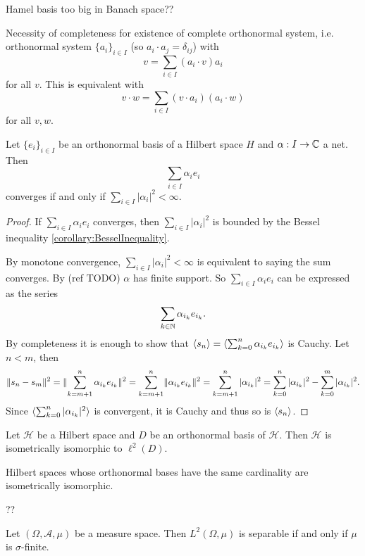 Hamel basis too big in Banach space??

Necessity of completeness for existence of complete orthonormal system, i.e. orthonormal system $\{a_i\}_{i\in I}$ (so $a_i \cdot a_j = \delta_{ij}$) with
\[ v = \sum_{i\in I}(a_i \cdot v)a_i \]
for all $v$. This is equivalent with
\[ v \cdot w = \sum_{i\in I}(v\cdot a_i)(a_i \cdot w) \]
for all $v,w$.


\begin{theorem}
Let $\{e_i\}_{i\in I}$ be an orthonormal basis of a Hilbert space $H$ and $\alpha: I\to \mathbb{C}$ a net. Then
\[ \sum_{i\in I}\alpha_i e_i \]
converges \textup{if and only if} $\sum_{i\in I}|\alpha_i|^2 < \infty$. 
\end{theorem}
\begin{proof}
If $\sum_{i\in I}\alpha_i e_i$ converges, then $\sum_{i\in I}|\alpha_i|^2$ is bounded by the Bessel inequality \ref{corollary:BesselInequality}.

By monotone convergence, $\sum_{i\in I}|\alpha_i|^2 < \infty$ is equivalent to saying the sum converges. By (ref TODO) $\alpha$ has finite support. So $\sum_{i\in I}\alpha_i e_i$ can be expressed as the series
\[ \sum_{k\in \mathbb{N}}\alpha_{i_k} e_{i_k}. \]
By completeness it is enough to show that $\langle s_n \rangle = \langle \sum_{k=0}^n\alpha_{i_k} e_{i_k} \rangle$ is Cauchy. Let $n < m$, then
\[ \lVert s_n - s_m\rVert^2 = \lVert\sum_{k=m+1}^n\alpha_{i_k} e_{i_k}\rVert^2 = \sum_{k=m+1}^n\lVert\alpha_{i_k} e_{i_k}\rVert^2 = \sum_{k=m+1}^n |\alpha_{i_k}|^2 = \sum_{k=0}^n|\alpha_{i_k}|^2 -\sum_{k=0}^m|\alpha_{i_k}|^2.  \]
Since $\langle \sum_{k=0}^n |\alpha_{i_k}|^2 \rangle$ is convergent, it is Cauchy and thus so is $\langle s_n \rangle$.
\end{proof}
\begin{corollary}
Let $\mathcal{H}$ be a Hilbert space and $D$ be an orthonormal basis of $\mathcal{H}$. Then $\mathcal{H}$ is isometrically isomorphic to $\ell^2(D)$.
\end{corollary}
\begin{corollary}
Hilbert spaces whose orthonormal bases have the same cardinality are isometrically isomorphic.
\end{corollary}

??
\begin{lemma}
Let $(\Omega,\mathcal{A}, \mu)$ be a measure space. Then $L^2(\Omega, \mu)$ is separable \textup{if and only if} $\mu$ is $\sigma$-finite.
\end{lemma}

